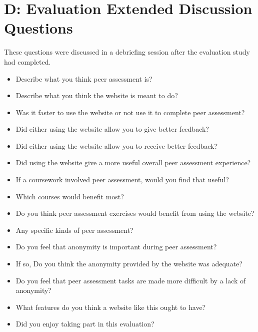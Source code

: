 \documentclass[a4paper,11pt]{report}
\begin{document}
\section*{D: Evaluation Extended Discussion Questions}
These questions were discussed in a debriefing session after the evaluation study had completed.\par
\begin{itemize}
\item Describe what you think peer assessment is?
\item Describe what you think the website is meant to do?
\vspace{1cm}
\item Was it faster to use the website or not use it to complete peer assessment?
\item Did either using the website allow you to give better feedback?
\item Did either using the website allow you to receive better feedback?
\item Did using the website give a more useful overall peer assessment experience?
\vspace{1cm}
\item If a coursework involved peer assessment, would you find that useful?
\item Which courses would benefit most?
\vspace{1cm}
\item Do you think peer assessment exercises would benefit from using the website?
\item Any specific kinds of peer assessment?
\vspace{1cm}
\item Do you feel that anonymity is important during peer assessment?
\item If so, Do you think the anonymity provided by the website was adequate?
\item Do you feel that peer assessment tasks are made more difficult by a lack of anonymity?
\vspace{1cm}
\item What features do you think a website like this ought to have?
\vspace{1cm}
\item Did you enjoy taking part in this evaluation?
\end{itemize}


\newpage
{}
\end{document}
